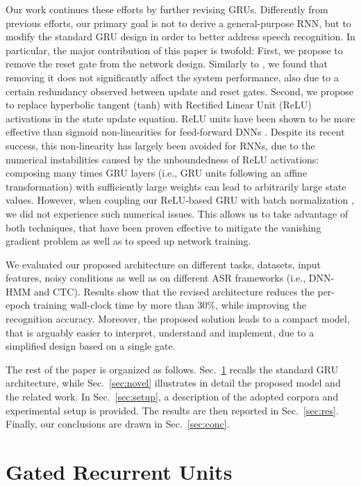 \documentclass[journal]{IEEEtran}
\begin{document}
Our work continues these efforts by further revising GRUs. Differently from previous efforts, our primary goal is not to derive a general-purpose RNN, but to modify the standard GRU design in order to better address speech recognition.
In particular, the major contribution of this paper is twofold: First, we propose to remove the reset gate from the network design. Similarly to \cite{mgru}, we found that removing it does not significantly affect the system performance, also due to a certain redundancy observed between update and reset gates.
Second, we propose to replace hyperbolic tangent (tanh) with Rectified Linear Unit (ReLU) activations \cite{relu} in the state update equation. 
ReLU units have been shown to be more effective than sigmoid non-linearities for feed-forward DNNs \cite{krizhevsky2012imagenet,dahl2012context}.
Despite its recent success, this non-linearity has largely been avoided for RNNs, due to the numerical instabilities caused by the unboundedness of ReLU activations: composing many times GRU layers (i.e., GRU units following an affine transformation) with sufficiently large weights can lead to arbitrarily large state values. However, when coupling our ReLU-based GRU with batch normalization \cite{batchnorm}, we did not experience such numerical issues. This allows us to take advantage of both techniques, that have been proven effective to mitigate the vanishing gradient problem as well as to speed up network training.    

We evaluated our proposed architecture on different tasks, datasets, input features, noisy conditions as well as on different ASR frameworks (i.e., DNN-HMM and CTC). Results show that the revised architecture reduces the per-epoch training wall-clock time by more than 30\%, while improving the recognition accuracy.  Moreover, the proposed solution leads to a compact model, that is arguably easier to interpret, understand and implement, due to a simplified design based on a single gate. 

The rest of the paper is organized as follows. Sec.~\ref{sec:rev_gru} recalls the standard GRU architecture, while Sec.~\ref{sec:novel} illustrates in detail the proposed model and the related work.
In Sec.~\ref{sec:setup}, a description of the adopted corpora and experimental setup is provided. The results are then reported in Sec.~\ref{sec:res}. Finally, our conclusions are drawn in Sec.~\ref{sec:conc}.

\section{Gated Recurrent Units} \label{sec:rev_gru}
\end{document}
